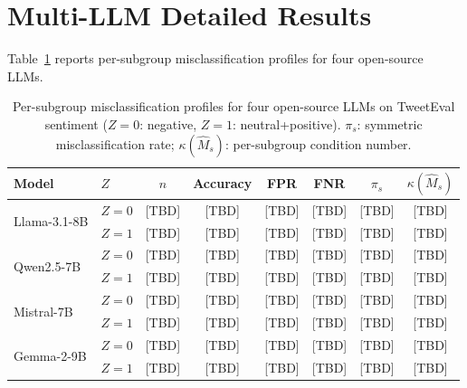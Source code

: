 
\section{Multi-LLM Detailed Results}
\label{app:multi_llm}

Table~\ref{tab:multi_llm_detail} reports per-subgroup misclassification profiles for four open-source LLMs.

\begin{table}[t]
\centering
\caption{Per-subgroup misclassification profiles for four open-source LLMs on TweetEval sentiment ($Z{=}0$: negative, $Z{=}1$: neutral+positive). $\pi_s$: symmetric misclassification rate; $\kappa(\hat{M}_s)$: per-subgroup condition number.}
\label{tab:multi_llm_detail}
\small
\begin{tabular}{llcccccc}
\toprule
Model & $Z$ & $n$ & Accuracy & FPR & FNR & $\pi_s$ & $\kappa(\hat{M}_s)$ \\
\midrule
\multirow{2}{*}{Llama-3.1-8B}
 & $Z{=}0$ & [TBD] & [TBD] & [TBD] & [TBD] & [TBD] & [TBD] \\
 & $Z{=}1$ & [TBD] & [TBD] & [TBD] & [TBD] & [TBD] & [TBD] \\
\midrule
\multirow{2}{*}{Qwen2.5-7B}
 & $Z{=}0$ & [TBD] & [TBD] & [TBD] & [TBD] & [TBD] & [TBD] \\
 & $Z{=}1$ & [TBD] & [TBD] & [TBD] & [TBD] & [TBD] & [TBD] \\
\midrule
\multirow{2}{*}{Mistral-7B}
 & $Z{=}0$ & [TBD] & [TBD] & [TBD] & [TBD] & [TBD] & [TBD] \\
 & $Z{=}1$ & [TBD] & [TBD] & [TBD] & [TBD] & [TBD] & [TBD] \\
\midrule
\multirow{2}{*}{Gemma-2-9B}
 & $Z{=}0$ & [TBD] & [TBD] & [TBD] & [TBD] & [TBD] & [TBD] \\
 & $Z{=}1$ & [TBD] & [TBD] & [TBD] & [TBD] & [TBD] & [TBD] \\
\bottomrule
\end{tabular}
\end{table}


